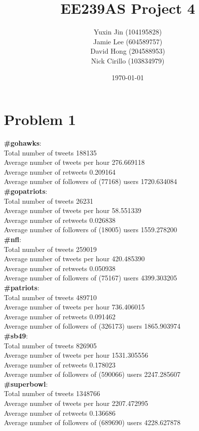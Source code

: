 \documentclass[12pt]{article}
\begin{document}
\title{\textbf{EE239AS Project 4}}
\author{Yuxin Jin \quad (104195828)\\
		Jamie Lee \quad (604589757)\\
        David Hong \quad (204588953) \\
        Nick Cirillo \quad (103834979)}
\date{\today}

\maketitle

\section*{Problem 1}
\textbf{\#gohawks}: \\
Total number of tweets 188135 \\
Average number of tweets per hour 276.669118 \\
Average number of retweets 0.209164 \\
Average number of followers of (77168) users 1720.634084 \\

\textbf{\#gopatriots}: \\
Total number of tweets 26231 \\
Average number of tweets per hour 58.551339 \\
Average number of retweets 0.026838 \\
Average number of followers of (18005) users 1559.278200 \\

\textbf{\#nfl}: \\
Total number of tweets 259019 \\ 
Average number of tweets per hour 420.485390 \\
Average number of retweets 0.050938 \\
Average number of followers of (75167) users 4399.303205 \\

\textbf{\#patriots}: \\
Total number of tweets 489710 \\
Average number of tweets per hour 736.406015 \\
Average number of retweets 0.091462 \\
Average number of followers of (326173) users 1865.903974 \\

\textbf{\#sb49}: \\
Total number of tweets 826905 \\
Average number of tweets per hour 1531.305556 \\
Average number of retweets 0.178023 \\
Average number of followers of (590066) users 2247.285607 \\

\textbf{\#superbowl}: \\
Total number of tweets 1348766 \\
Average number of tweets per hour 2207.472995 \\
Average number of retweets 0.136686 \\
Average number of followers of (689690) users 4228.627878 \\
\end{document}
